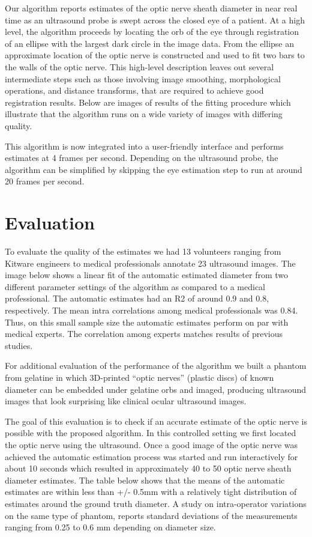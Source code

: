 \documentclass{llncs}
\begin{document}
Our algorithm reports estimates of the optic nerve sheath diameter in near real
time as an ultrasound probe is swept across the closed eye of a patient. At a
high level, the algorithm proceeds by locating the orb of the eye through
registration of an ellipse with the largest dark circle in the image data. From
the ellipse an approximate location of the optic nerve is constructed and used
to fit two bars to the walls of the optic nerve. This high-level description
leaves out several intermediate steps such as those involving image smoothing,
morphological operations, and distance transforms, that are required to achieve
good registration results. Below are images of results of the fitting procedure
which illustrate that the algorithm runs on a wide variety of images with
differing quality.


This algorithm is now integrated into a user-friendly interface and performs
estimates at 4 frames per second. Depending on the ultrasound probe, the
algorithm can be simplified by skipping the eye estimation step to run at
around 20 frames per second.

\section{Evaluation}

To evaluate the quality of the estimates we had 13 volunteers ranging from
Kitware engineers to medical professionals annotate 23 ultrasound images.  The
image below shows a linear fit of the automatic estimated diameter from two
different parameter settings of the algorithm as compared to a medical
professional. The automatic estimates had an R2 of around 0.9 and 0.8,
respectively. The mean intra correlations among medical professionals was 0.84.
Thus, on this small sample size the automatic estimates perform on par with
medical experts. The correlation among experts matches results of previous
studies.

For additional evaluation of the performance of the algorithm we built a
phantom from gelatine in which 3D-printed “optic nerves” (plastic discs) of
known diameter can be embedded under gelatine orbs and imaged, producing
ultrasound images that look surprising like clinical ocular ultrasound images.

The goal of this evaluation is to check if an accurate estimate of the optic
nerve is possible with the proposed algorithm. In this controlled setting we
first located the optic nerve using the ultrasound. Once a good image of the
optic nerve was achieved the automatic estimation process was started and run
interactively for about 10 seconds which resulted in approximately 40 to 50
optic nerve sheath diameter estimates. The table below shows that the means of
the automatic estimates are within less than +/- 0.5mm  with a relatively tight
distribution of estimates around the ground truth diameter. A study on
intra-operator variations on the same type of phantom, reports standard
deviations of the measurements ranging from 0.25 to 0.6 mm depending on
diameter size.  
\end{document}
